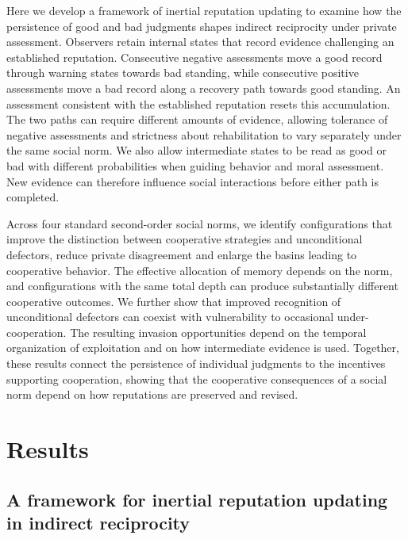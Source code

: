 \documentclass[fleqn,10pt]{wlscirep}
\begin{document}
Here we develop a framework of inertial reputation updating to examine how the persistence of good and bad judgments shapes indirect reciprocity under private assessment. Observers retain internal states that record evidence challenging an established reputation. Consecutive negative assessments move a good record through warning states towards bad standing, while consecutive positive assessments move a bad record along a recovery path towards good standing. An assessment consistent with the established reputation resets this accumulation. The two paths can require different amounts of evidence, allowing tolerance of negative assessments and strictness about rehabilitation to vary separately under the same social norm. We also allow intermediate states to be read as good or bad with different probabilities when guiding behavior and moral assessment. New evidence can therefore influence social interactions before either path is completed. 

Across four standard second-order social norms, we identify configurations that improve the distinction between cooperative strategies and unconditional defectors, reduce private disagreement and enlarge the basins leading to cooperative behavior. The effective allocation of memory depends on the norm, and configurations with the same total depth can produce substantially different cooperative outcomes. We further show that improved recognition of unconditional defectors can coexist with vulnerability to occasional under-cooperation. The resulting invasion opportunities depend on the temporal organization of exploitation and on how intermediate evidence is used. Together, these results connect the persistence of individual judgments to the incentives supporting cooperation, showing that the cooperative consequences of a social norm depend on how reputations are preserved and revised.

\section*{Results}\label{sec_model}

\subsection*{A framework for inertial reputation updating in indirect reciprocity}
\label{sec:model-overview}
\end{document}

